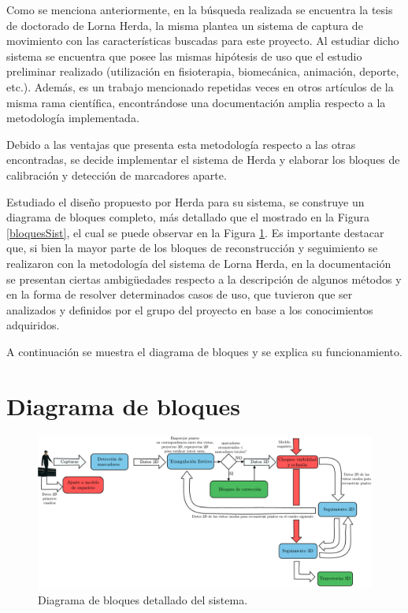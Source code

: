 Como se menciona anteriormente, en la búsqueda realizada se encuentra la tesis de doctorado de Lorna Herda\cite{herda}, la misma plantea un sistema de captura de movimiento con las características buscadas para este proyecto. Al estudiar dicho sistema se encuentra que posee las mismas hipótesis de uso que el estudio preliminar realizado (utilización en fisioterapia, biomecánica, animación, deporte, etc.). Además, es un trabajo mencionado repetidas veces en otros artículos de la misma rama científica, encontrándose una documentación amplia respecto a la metodología implementada.

Debido a las ventajas que presenta esta metodología respecto a las otras encontradas, se decide implementar el sistema de Herda y elaborar los bloques de calibración y detección de marcadores aparte.

Estudiado el diseño propuesto por Herda para su sistema, se construye un diagrama de bloques completo, más detallado que el mostrado en la Figura \ref{bloquesSist}, el cual se puede observar en la Figura \ref{diagBloq}. Es importante destacar que, si bien la mayor parte de los bloques de reconstrucción y seguimiento se realizaron con la metodología del sistema de Lorna Herda\cite{herda}, en la documentación se presentan ciertas ambigüedades respecto a la descripción de algunos métodos y en la forma de resolver determinados casos de uso, que tuvieron que ser analizados y definidos por el grupo del proyecto en base a los conocimientos adquiridos.

A continuación se muestra el diagrama de bloques y se explica su funcionamiento.

\section{Diagrama de bloques}

\vspace{-0.5cm}
\begin{figure}[ht!]
\hspace{-1cm}
\includegraphics[scale=0.55]{img/Sistema_completo/Diagramadebloques_Herda.pdf}
\vspace{-1cm}
\caption{Diagrama de bloques detallado del sistema.}
\label{diagBloq}
\end{figure}

